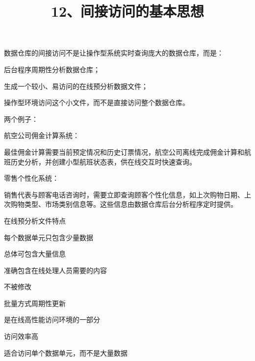 \documentclass[UTF8,zihao=-4]{ctexart}
\begin{document}
\title{12、间接访问的基本思想}
\author{}
\date{}
\maketitle

数据仓库的间接访问不是让操作型系统实时查询庞大的数据仓库，而是：\par

后台程序周期性分析数据仓库；\par
生成一个较小、易访问的在线预分析数据文件；\par
操作型环境访问这个小文件，而不是直接访问整个数据仓库。\par

两个例子：\par

航空公司佣金计算系统：\par
最佳佣金计算需要当前预定情况和历史订票情况，航空公司离线完成佣金计算和航班历史分析，并创建小型航班状态表，供在线交互时快速查询。\par

零售个性化系统：\par
销售代表与顾客电话咨询时，需要立即查询顾客个性化信息，如上次购物日期、上次购物类型、市场类别信息等。这些信息由数据仓库后台分析程序定时提供。\par

在线预分析文件特点\par

每个数据单元只包含少量数据\par
总体可包含大量信息\par
准确包含在线处理人员需要的内容\par
不被修改\par
批量方式周期性更新\par
是在线高性能访问环境的一部分\par
访问效率高\par
适合访问单个数据单元，而不是大量数据\par
\end{document}
